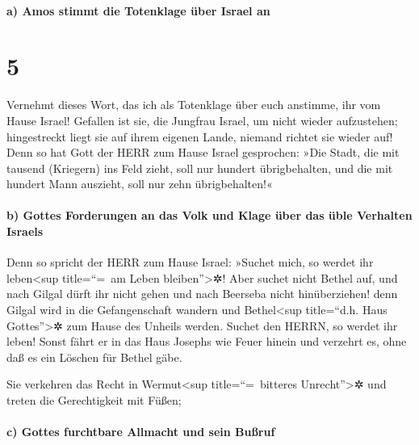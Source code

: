 \hypertarget{a-amos-stimmt-die-totenklage-uxfcber-israel-an}{%
\paragraph{a) Amos stimmt die Totenklage über Israel
an}\label{a-amos-stimmt-die-totenklage-uxfcber-israel-an}}

\hypertarget{section-4}{%
\section{5}\label{section-4}}

Vernehmt dieses Wort, das ich als Totenklage über euch
anstimme, ihr vom Hause Israel! Gefallen ist sie, die
Jungfrau Israel, um nicht wieder aufzustehen; hingestreckt liegt sie auf
ihrem eigenen Lande, niemand richtet sie wieder auf! Denn
so hat Gott der HERR zum Hause Israel gesprochen: »Die Stadt, die mit
tausend (Kriegern) ins Feld zieht, soll nur hundert übrigbehalten, und
die mit hundert Mann auszieht, soll nur zehn übrigbehalten!«

\hypertarget{b-gottes-forderungen-an-das-volk-und-klage-uxfcber-das-uxfcble-verhalten-israels}{%
\paragraph{b) Gottes Forderungen an das Volk und Klage über das üble
Verhalten
Israels}\label{b-gottes-forderungen-an-das-volk-und-klage-uxfcber-das-uxfcble-verhalten-israels}}

Denn so spricht der HERR zum Hause Israel: »Suchet mich,
so werdet ihr leben\textless sup title=``=~am Leben
bleiben''\textgreater✲! Aber suchet nicht Bethel auf, und
nach Gilgal dürft ihr nicht gehen und nach Beerseba nicht hinüberziehen!
denn Gilgal wird in die Gefangenschaft wandern und Bethel\textless sup
title=``d.h. Haus Gottes''\textgreater✲ zum Hause des Unheils werden.
Suchet den HERRN, so werdet ihr leben! Sonst fährt er in
das Haus Josephs wie Feuer hinein und verzehrt es, ohne daß es ein
Löschen für Bethel gäbe.

Sie verkehren das Recht in Wermut\textless sup
title=``=~bitteres Unrecht''\textgreater✲ und treten die Gerechtigkeit
mit Füßen;

\hypertarget{c-gottes-furchtbare-allmacht-und-sein-buuxdfruf}{%
\paragraph{c) Gottes furchtbare Allmacht und sein
Bußruf}\label{c-gottes-furchtbare-allmacht-und-sein-buuxdfruf}}

